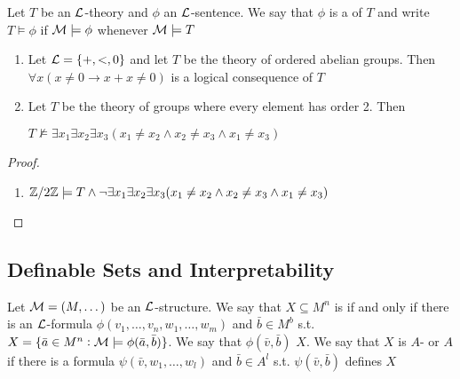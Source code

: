 \documentclass[11pt]{article}
\begin{document}
\begin{definition}[]
Let \(T\) be an \(\mathcal{L}\)-theory and \(\phi\) an \(\mathcal{L}\)-sentence. We say that
\(\phi\) is a  of \(T\) and write \(T\models\phi\) if
\(\mathcal{M}\models\phi\) whenever \(\mathcal{M}\models T\)
\end{definition}

\begin{proposition}[]
\begin{enumerate}
\item Let \(\mathcal{L}=\{+,<,0\}\) and let \(T\) be the theory of ordered abelian groups.
Then \(\forall x(x\neq 0\to x+x\neq 0)\) is a logical consequence of \(T\)
\item Let \(T\) be the theory of groups where every element has order 2. Then\par
\(T\not\models\exists x_1\exists x_2\exists x_3(x_1\neq x_2\wedge
      x_2\neq x_3\wedge x_1\neq x_3)\)
\end{enumerate}
\end{proposition}

\begin{proof}
\begin{enumerate}
\item \(\mathbb{Z}/2\mathbb{Z}\models T\wedge\neg\exists x_1\exists x_2\exists x_3(x_1\neq x_2\wedge
      x_2\neq x_3\wedge x_1\neq x_3)\)
\end{enumerate}
\end{proof}
\subsection{Definable Sets and Interpretability}
\label{sec:org3a393e4}
\begin{definition}[]
Let \(\mathcal{M}=(M,\dots)\) be an \(\mathcal{L}\)-structure. We say that \(X\subseteq M^n\)
is  if and only if there is an \(\mathcal{L}\)-formula 
\(\phi(v_1,\dots,v_n,w_1,\dots,w_m)\) and \(\bar{b}\in M^b\) s.t. 
\(X=\{\bar{a}\in M^n:\mathcal{M}\models\phi(\bar{a},\bar{b})\}\). We say that
\(\phi(\bar{v},\bar{b})\)  \(X\). We say that \(X\) is
\(A\)- or   \(A\) if there is a formula 
\(\psi(\bar{v},w_1,\dots,w_l)\) and \(\bar{b}\in A^l\) s.t.
\(\psi(\bar{v},\bar{b})\) defines \(X\)
\end{definition}
\end{document}
